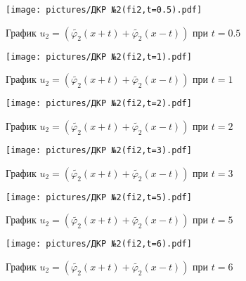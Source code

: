 \documentclass[a4paper, 12pt,fleqn]{extarticle}
\begin{document}
        \begin{figure}
            \caption{График $u_2=(\tilde{\varphi_2}(x+t)+\tilde{\varphi_2}(x-t))$ при $t=0.5$}
            \texttt{[image: pictures/ДКР №2(fi2,t=0.5).pdf]}
        \end{figure}
        \begin{figure}
            \caption{График $u_2=(\tilde{\varphi_2}(x+t)+\tilde{\varphi_2}(x-t))$ при $t=1$}
            \texttt{[image: pictures/ДКР №2(fi2,t=1).pdf]}
        \end{figure}
        \begin{figure}
            \caption{График $u_2=(\tilde{\varphi_2}(x+t)+\tilde{\varphi_2}(x-t))$ при $t=2$}
            \texttt{[image: pictures/ДКР №2(fi2,t=2).pdf]}
        \end{figure}
        \begin{figure}
            \caption{График $u_2=(\tilde{\varphi_2}(x+t)+\tilde{\varphi_2}(x-t))$ при $t=3$}
            \texttt{[image: pictures/ДКР №2(fi2,t=3).pdf]}
        \end{figure}
        \begin{figure}
            \caption{График $u_2=(\tilde{\varphi_2}(x+t)+\tilde{\varphi_2}(x-t))$ при $t=5$}
            \texttt{[image: pictures/ДКР №2(fi2,t=5).pdf]}
        \end{figure}
        \begin{figure}
            \caption{График $u_2=(\tilde{\varphi_2}(x+t)+\tilde{\varphi_2}(x-t))$ при $t=6$}
            \texttt{[image: pictures/ДКР №2(fi2,t=6).pdf]}
        \end{figure}
\end{document}

